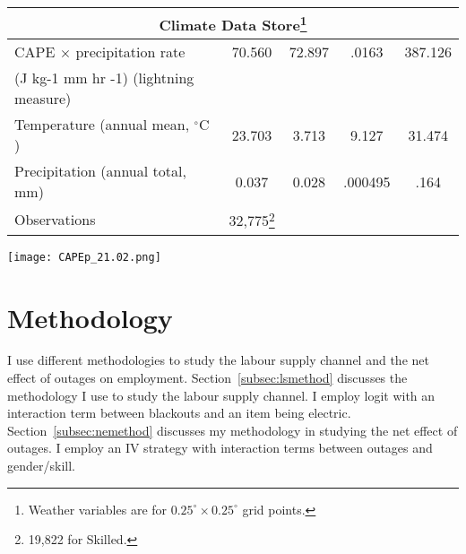\documentclass[12pt]{article}
\begin{document}
\begin{table}[htbp]
\begin{adjustwidth}{-0.4in}{-0.4in}
\begin{minipage}[t]{0.55\textwidth}
\begin{tabular}{l c c c c}
        \hline
        \multicolumn{5}{c}{Climate Data Store\footnote{Weather variables are for $0.25^\circ \times 0.25^\circ$ grid points.}}\\
        \hline
         CAPE $\times$ precipitation rate &      70.560&      72.897&    .0163&    387.126\\
        (J kg-1 mm hr -1) (lightning measure)& &&&\\
        Temperature (annual mean, $^\circ\text{C}$)   &      23.703&       3.713&    9.127&    31.474\\
        Precipitation (annual total, mm)   &       0.037&       0.028&     .000495&    .164\\
        \hline
        Observations        &       32,775\footnote{19,822 for Skilled.}&            &            &            \\
        \hline\hline
    \end{tabular}  
  \end{minipage}
  \hfill
  \begin{minipage}[t]{0.45\textwidth}
    \vspace{20pt}
    \centering
    \texttt{[image: CAPEp\_21.02.png]}
    \label{fig:map}
  \end{minipage}
  \end{adjustwidth}
\end{table}

\section{Methodology} \label{sec:methodology}
I use different methodologies to study the labour supply channel and the net effect of outages on employment. Section~\ref{subsec:lsmethod} discusses the methodology I use to study the labour supply channel. I employ logit with an interaction term between blackouts and an item being electric. Section~\ref{subsec:nemethod} discusses my methodology in studying the net effect of outages. I employ an IV strategy with interaction terms between outages and gender/skill. 
\end{document}
